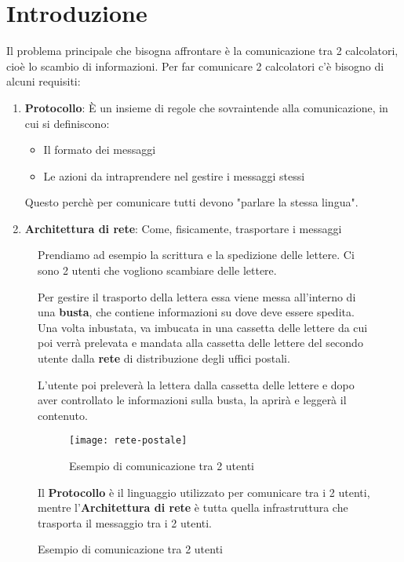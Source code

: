 \documentclass[a4paper]{article}
\begin{document}


\tableofcontents
\pagebreak

\section{Introduzione}
Il problema principale che bisogna affrontare è la comunicazione tra 2 calcolatori,
cioè lo scambio di informazioni. Per far comunicare 2 calcolatori c'è bisogno di
alcuni requisiti:
\begin{enumerate}
  \item \textbf{Protocollo}: È un insieme di regole che sovraintende alla comunicazione,
    in cui si definiscono:
    \begin{itemize}
      \item Il formato dei messaggi
      \item Le azioni da intraprendere nel gestire i messaggi stessi
    \end{itemize}
    Questo perchè per comunicare tutti devono "parlare la stessa lingua".

  \item \textbf{Architettura di rete}: Come, fisicamente, trasportare i messaggi
\end{enumerate}

\begin{figure}[H]
  \begin{example}
    Prendiamo ad esempio la scrittura e la spedizione delle lettere. Ci sono 2
    utenti che vogliono scambiare delle lettere.
    
    Per gestire il trasporto della
    lettera essa viene messa all'interno di una \textbf{busta}, che contiene informazioni
    su dove deve essere spedita. Una volta inbustata, va imbucata in una cassetta 
    delle lettere da cui poi verrà prelevata e mandata alla cassetta delle lettere 
    del secondo utente dalla \textbf{rete} di distribuzione degli uffici postali.

    L'utente poi preleverà la lettera dalla cassetta delle lettere e dopo aver
    controllato le informazioni sulla busta, la aprirà e leggerà il contenuto.
    \begin{figure}[H]
      \begin{center}
        \texttt{[image: rete-postale]}
      \end{center}
      \caption{Esempio di comunicazione tra 2 utenti}
    \end{figure}

    Il \textbf{Protocollo} è il linguaggio utilizzato per comunicare tra i 2
    utenti, mentre l'\textbf{Architettura di rete} è tutta quella infrastruttura
    che trasporta il messaggio tra i 2 utenti.
  \end{example}
\end{figure}
\end{document}
